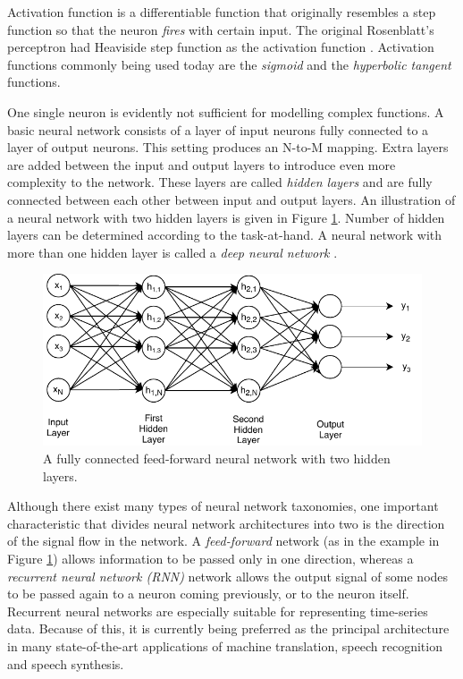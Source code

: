 Activation function is a differentiable function that originally resembles a step function so that the neuron \textit{fires} with certain input. The original Rosenblatt's perceptron had Heaviside step function as the activation function \citep{Rosenblatt58theperceptron}. Activation functions commonly being used today are the \textit{sigmoid} and the \textit{hyperbolic tangent} functions. 

One single neuron is evidently not sufficient for modelling complex functions. A basic neural network consists of a layer of input neurons fully connected to a layer of output neurons. This setting produces an N-to-M mapping. Extra layers are added between the input and output layers to introduce even more complexity to the network. These layers are called \textit{hidden layers} and are fully connected between each other between input and output layers. An illustration of a neural network with two hidden layers is given in Figure \ref{sota:neuralnet}. Number of hidden layers can be determined according to the task-at-hand. A neural network with more than one hidden layer is called a \textit{deep neural network} \citep{yoav}. 

\begin{figure}[t]
  \centering
  \includegraphics[width=0.9\linewidth]{img/NeuralNet.pdf}
  \caption{A fully connected feed-forward neural network with two hidden layers.}
  \label{sota:neuralnet}
\end{figure}

Although there exist many types of neural network taxonomies, one important characteristic that divides neural network architectures into two is the direction of the signal flow in the network. A \textit{feed-forward} network (as in the example in Figure \ref{sota:neuralnet}) allows information to be passed only in one direction, whereas a \textit{recurrent neural network (RNN)} network allows the output signal of some nodes to be passed again to a neuron coming previously, or to the neuron itself. Recurrent neural networks are especially suitable for representing time-series data. Because of this, it is currently being preferred as the principal architecture in many state-of-the-art applications of machine translation, speech recognition and speech synthesis. 

